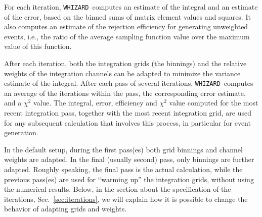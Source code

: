 \documentclass[12pt]{book}
\newcommand{\ttt}[1]{\texttt{#1}}
\newcommand{\whizard}{\ttt{WHIZARD}}
\begin{document}
For each iteration, \whizard\ computes an estimate of the integral and an
estimate of the error, based on the binned sums of matrix element values and
squares.  It also computes an estimate of the rejection efficiency for
generating unweighted events, i.e., the ratio of the average sampling function
value over the maximum value of this function.

After each iteration, both the integration grids (the binnings) and the
relative weights of the integration channels can be adapted to
minimize the variance estimate of the integral.  After each pass of several
iterations, \whizard\ computes an average of the iterations within the pass,
the corresponding error estimate, and a $\chi^2$ value.  The integral, error,
efficiency and $\chi^2$ value computed for the most recent integration pass,
together with the most recent integration grid, are used for any subsequent
calculation that involves this process, in particular for event generation.

In the default setup, during the first pass(es) both grid binnings and channel
weights are adapted.  In the final (usually second) pass, only binnings are
further adapted.  Roughly speaking, the final pass is the actual calculation,
while the previous pass(es) are used for ``warming up'' the integration grids,
without using the numerical results. Below, in the section about the
specification of the iterations, Sec.~\ref{sec:iterations}, we will
explain how it is possible to change the behavior of adapting grids
and weights.
\end{document}
